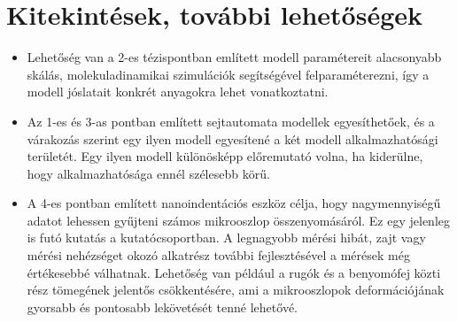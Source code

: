 \section*{Kitekintések, további lehetőségek}
\begin{itemize}
\item Lehetőség van a 2-es tézispontban említett modell paramétereit alacsonyabb skálás, molekuladinamikai szimulációk segítségével felparaméterezni, így a modell jóslatait konkrét anyagokra lehet vonatkoztatni.

\item Az 1-es és 3-as pontban említett sejtautomata modellek egyesíthetőek, és a várakozás szerint egy ilyen modell egyesítené a két modell alkalmazhatósági területét. Egy ilyen modell különösképp előremutató volna, ha kiderülne, hogy alkalmazhatósága ennél szélesebb körű.

\item A 4-es pontban említett nanoindentációs eszköz célja, hogy nagymennyiségű adatot lehessen gyűjteni számos mikrooszlop összenyomásáról. Ez egy jelenleg is futó kutatás a kutatócsoportban. A legnagyobb mérési hibát, zajt vagy mérési nehézséget okozó alkatrész további fejlesztésével a mérések még értékesebbé válhatnak. Lehetőség van például a rugók és a benyomófej közti rész tömegének jelentős csökkentésére, ami a mikrooszlopok deformációjának gyorsabb és pontosabb lekövetését tenné lehetővé.
\end{itemize}